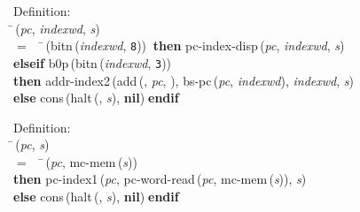 \begin{tabbing}{\sc Definition}: \\  
\=\,({\it{pc\/}}, {\it{indexwd\/}}, {\it{s\/}}) \\ 
$=$$\;\;\;\;$\=\,({\rm{bitn}}\,({\it{indexwd\/}}, {\tt{8}}))$\;\;${\bf then }{\rm{pc-index-disp}}\,({\it{pc\/}}, {\it{indexwd\/}}, {\it{s\/}}) \\ 
{\bf elseif }{\rm{b0p}}\,({\rm{bitn}}\,({\it{indexwd\/}}, {\tt{3}})) \\ 
{\bf then }{\rm{addr-index2}}\,({\rm{add}}\,({}, {\it{pc\/}}, {}), {\rm{bs-pc}}\,({\it{pc\/}}, {\it{indexwd\/}}), {\it{indexwd\/}}, {\it{s\/}}) \\ 
{\bf else }{\rm{cons}}\,({\rm{halt}}\,({}, {\it{s\/}}), {\bf{nil}})$\;${\bf  endif}\-\-
\end{tabbing}

\begin{tabbing}{\sc Definition}: \\  
\=\,({\it{pc\/}}, {\it{s\/}}) \\ 
$=$$\;\;\;\;$\=\,({\it{pc\/}}, {\rm{mc-mem}}\,({\it{s\/}})) \\ 
{\bf then }{\rm{pc-index1}}\,({\it{pc\/}}, {\rm{pc-word-read}}\,({\it{pc\/}}, {\rm{mc-mem}}\,({\it{s\/}})), {\it{s\/}}) \\ 
{\bf else }{\rm{cons}}\,({\rm{halt}}\,({}, {\it{s\/}}), {\bf{nil}})$\;${\bf  endif}\-\-
\end{tabbing}

